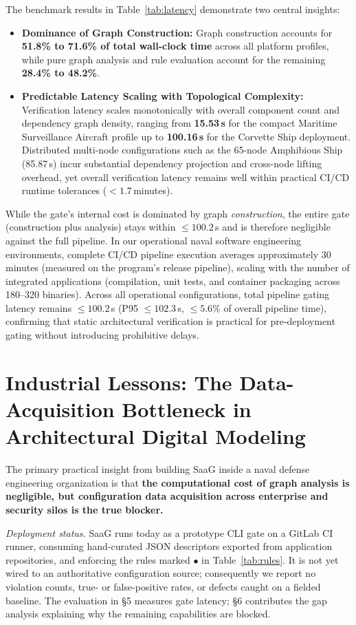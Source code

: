 \documentclass[sigconf,9pt]{acmart}
\begin{document}
The benchmark results in Table~\ref{tab:latency} demonstrate two central insights:
\begin{itemize}\itemsep=0.5pt
\item \textbf{Dominance of Graph Construction:} Graph construction accounts for \textbf{51.8\% to 71.6\% of total wall-clock time} across all platform profiles, while pure graph analysis and rule evaluation account for the remaining \textbf{28.4\% to 48.2\%}.
\item \textbf{Predictable Latency Scaling with Topological Complexity:} Verification latency scales monotonically with overall component count and dependency graph density, ranging from \textbf{15.53\,s} for the compact Maritime Surveillance Aircraft profile up to \textbf{100.16\,s} for the Corvette Ship deployment. Distributed multi-node configurations such as the 65-node Amphibious Ship (85.87\,s) incur substantial dependency projection and cross-node lifting overhead, yet overall verification latency remains well within practical CI/CD runtime tolerances ($<1.7$\,minutes).
\end{itemize}
While the gate's internal cost is dominated by graph \emph{construction}, the entire gate (construction plus analysis) stays within $\le 100.2$\,s and is therefore negligible against the full pipeline.
In our operational naval software engineering environments, complete CI/CD pipeline execution averages approximately 30 minutes (measured on the program's release pipeline), scaling with the number of integrated applications (compilation, unit tests, and container packaging across 180--320 binaries). Across all operational configurations, total pipeline gating latency remains $\le 100.2$\,s (P95 $\le 102.3$\,s, $\le 5.6\%$ of overall pipeline time), confirming that static architectural verification is practical for pre-deployment gating without introducing prohibitive delays.

\section{Industrial Lessons: The Data-Acquisition Bottleneck in Architectural Digital Modeling}

The primary practical insight from building SaaG inside a naval defense engineering organization is that \textbf{the computational cost of graph analysis is negligible, but configuration data acquisition across enterprise and security silos is the true blocker.}

\noindent\emph{Deployment status.} SaaG runs today as a prototype CLI gate on a GitLab CI runner, consuming hand-curated JSON descriptors exported from application repositories, and enforcing the rules marked $\bullet$ in Table~\ref{tab:rules}. It is not yet wired to an authoritative configuration source; consequently we report no violation counts, true- or false-positive rates, or defects caught on a fielded baseline. The evaluation in \S5 measures gate latency; \S6 contributes the gap analysis explaining why the remaining capabilities are blocked.
\end{document}
